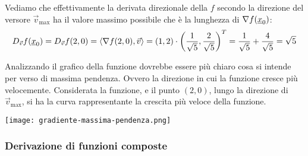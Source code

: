 Vediamo che effettivamente la derivata direzionale della \(f\) secondo la direzione del versore \(\vec{v}_{\max}\) ha il valore massimo possibile che è la lunghezza di \(\nabla f(\underline{x}_0)\):
\[
    D_{\vec{v} } f(\underline{x}_0) = D_{\vec{v} } f(2,0) = \langle\nabla f(2,0),\vec{v}\rangle = (1,2) \cdot {\left(\frac{1}{\sqrt{5}},\frac{2}{\sqrt{5}}\right)}^{T} = \frac{1}{\sqrt{5}}+ \frac{4}{\sqrt{5}} = \sqrt{5}
\]

\filbreak{}
Analizzando il grafico della funzione dovrebbe essere più chiaro cosa si intende per verso di massima pendenza. Ovvero la direzione in cui la funzione cresce più velocemente. Considerata la funzione, e il punto \((2,0)\), lungo la direzione di \(\vec{v}_{\max}\), si ha la curva rappresentante la crescita più veloce della funzione.

\begin{center}
    \texttt{[image: gradiente-massima-pendenza.png]}
\end{center}

\pagebreak
\subsubsection{Derivazione di funzioni composte}


